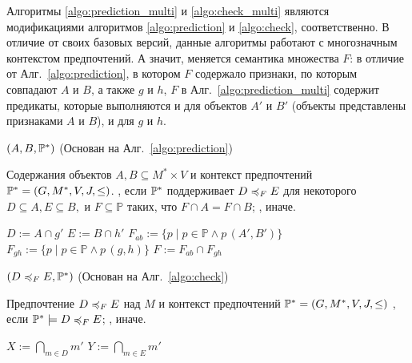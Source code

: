 	Алгоритмы \ref{algo:prediction_multi} и \ref{algo:check_multi} являются модификациями алгоритмов \ref{algo:prediction} и \ref{algo:check}, соответственно. В отличие от своих базовых версий, данные алгоритмы работают с многозначным контекстом предпочтений. А значит, меняется семантика множества $F$: в отличие от Алг.~\ref{algo:prediction}, в котором $F$ содержало признаки, по которым совпадают $A$ и $B$, а также $g$ и $h$, $F$ в Алг.~\ref{algo:prediction_multi} содержит предикаты, которые выполняются и для объектов $A'$ и $B'$ (объекты представлены признаками $A$ и $B$), и для $g$ и $h$.
	
	\begin{algorithm}
		\caption{$(A, B, \mathbb{P}^*)$ (Основан на Алг.~\ref{algo:prediction})}
		\label{algo:prediction_multi}
		\begin{algorithmic}[1]
			\REQUIRE Содержания объектов $A, B \subseteq M^* \times V$ и контекст предпочтений $\mathbb{P}^* = (G, M^*, V, J, \leq)$.
			\ENSURE \TRUE, если $\mathbb{P}^*$ поддерживает $D \preccurlyeq_{F} E$ для некоторого $D \subseteq A, E \subseteq B,$ и $F \subseteq \mathbb{P}$ таких, что $F \cap A = F \cap B$; \FALSE, иначе.
			\item[]
			\STATE $D := A \cap g'$
			\STATE $E := B \cap h'$
			\STATE $F_{ab} := \{p\;|\;p \in \mathbb{P} \wedge p\,(A', B')\}$
			\STATE $F_{gh} := \{p\;|\;p \in \mathbb{P} \wedge p\,(g, h)\}$
			\STATE $F := F_{ab} \cap F_{gh}$
			\IF{$\PP \models \DEF$}
			\RETURN \TRUE
			\ENDIF
			\ENDFOR
			\ENDFOR
			\RETURN \FALSE
		\end{algorithmic}
	\end{algorithm}
	
	\begin{algorithm}
		\caption{$(D \preccurlyeq_{F} E, \mathbb{P}^*)$ (Основан на Алг.~\ref{algo:check})}
		\label{algo:check_multi}
		\begin{algorithmic}[1]
			\REQUIRE Предпочтение $D \preccurlyeq_{F} E$ над $M$ и контекст предпочтений $\mathbb{P}^* = (G, M^*, V, J, \leq)$
			\ENSURE \TRUE, если $\mathbb{P}^* \models D \preccurlyeq_{F} E$; \FALSE, иначе.
			\item[]
			\STATE $X := \bigcap_{m \in D}m'$
			\STATE $Y := \bigcap_{m \in E}m'$
			\FORALL{$g \in X$}
			\FORALL{$h \in Y$}
			\IF {$g \not\leq h$ \AND $p\,(g, h)\: \forall p \in F$}
			\RETURN \FALSE
			\ENDIF
			\ENDFOR
			\ENDFOR
			\RETURN \TRUE
		\end{algorithmic}
	\end{algorithm}